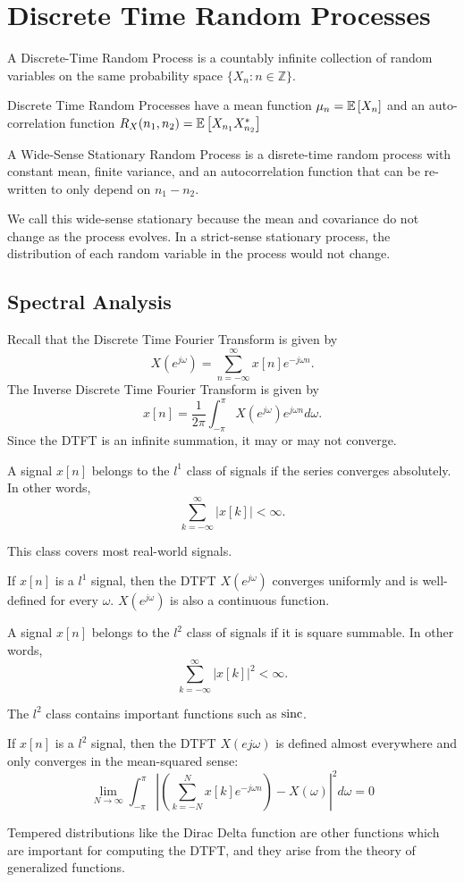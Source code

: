 \section{Discrete Time Random Processes}
\begin{definition}
	A Discrete-Time Random Process is a countably infinite collection of random variables on the same probability space $\{X_n: n\in\mathbb{Z}\}$.
	\label{defn:discrete-time-rp}
\end{definition}
Discrete Time Random Processes have a mean function $\mu_n = \mathbb{E}\left[X_n\right]$ and an auto-correlation function $R_X(n_1, n_2) = \mathbb{E}\left[X_{n_1}X_{n_2}^*\right]$
\begin{definition}
	A Wide-Sense Stationary Random Process is a disrete-time random process with constant mean, finite variance, and an autocorrelation function that can be re-written to only depend on $n_1-n_2$.
	\label{defn:wss-process}
\end{definition}
We call this wide-sense stationary because the mean and covariance do not change as the process evolves.
In a strict-sense stationary process, the distribution of each random variable in the process would not change.
\subsection{Spectral Analysis}
Recall that the Discrete Time Fourier Transform is given by \[
	X(e^{j\omega}) = \sum_{n=-\infty}^{\infty}x[n]e^{-j\omega n}.
\]
The Inverse Discrete Time Fourier Transform is given by \[
	x[n] = \frac{1}{2\pi}\int_{-\pi}^{\pi}X(e^{j\omega})e^{j\omega n}d\omega.
\]
Since the DTFT is an infinite summation, it may or may not converge.
\begin{definition}
	A signal $x[n]$ belongs to the $l^1$ class of signals if the series converges absolutely. In other words,
	\[
		\sum_{k=-\infty}^{\infty}|x[k]| < \infty.
	\]
	\label{defn:l1-class}
\end{definition}
This class covers most real-world signals.
\begin{theorem}
	If $x[n]$ is a $l^1$ signal, then the DTFT $X(e^{j\omega})$ converges uniformly and is well-defined for every $\omega$. $X(e^{j\omega})$ is also a continuous function.
	\label{thm:l1-dtft}
\end{theorem}
\begin{definition}
	A signal $x[n]$ belongs to the $l^2$ class of signals if it is square summable. In other words,
	\[
		\sum_{k=-\infty}^{\infty}|x[k]|^2 < \infty.
	\]
	\label{defn:l2-class}
\end{definition}
The $l^2$ class contains important functions such as $\operatorname*{sinc}$.
\begin{theorem}
	If $x[n]$ is a $l^2$ signal, then the DTFT $X(e{j\omega})$ is defined almost everywhere and only converges in the mean-squared sense:
	\[
		\lim_{N\to\infty} \int_{-\pi}^{\pi}\left|\left(\sum_{k=-N}^N x[k]e^{-j\omega n}\right) - X(\omega)\right|^2d\omega = 0
	\]
	\label{thm:l2-dtft}
\end{theorem}
Tempered distributions like the Dirac Delta function are other functions which are important for computing the DTFT, and they arise from the theory of generalized functions.

